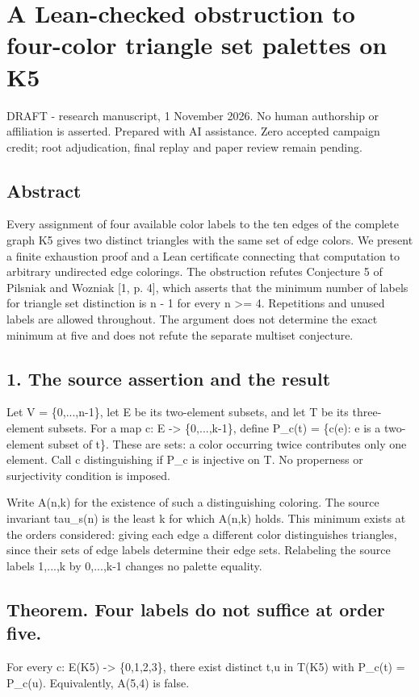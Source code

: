 \documentclass[10pt]{article}
\begin{document}
\section*{A Lean-checked obstruction to four-color triangle set palettes on K5}
DRAFT - research manuscript, 1 November 2026. No human authorship or affiliation is asserted. Prepared with AI assistance. Zero accepted campaign credit; root adjudication, final replay and paper review remain pending.


\subsection*{Abstract}
Every assignment of four available color labels to the ten edges of the complete graph K5 gives two distinct triangles with the same set of edge colors. We present a finite exhaustion proof and a Lean certificate connecting that computation to arbitrary undirected edge colorings. The obstruction refutes Conjecture 5 of Pilsniak and Wozniak [1, p. 4], which asserts that the minimum number of labels for triangle set distinction is n - 1 for every n >= 4. Repetitions and unused labels are allowed throughout. The argument does not determine the exact minimum at five and does not refute the separate multiset conjecture.


\subsection*{1. The source assertion and the result}
Let V = \{0,...,n-1\}, let E be its two-element subsets, and let T be its three-element subsets. For a map c: E -> \{0,...,k-1\}, define P\_c(t) = \{c(e): e is a two-element subset of t\}. These are sets: a color occurring twice contributes only one element. Call c distinguishing if P\_c is injective on T. No properness or surjectivity condition is imposed.


Write A(n,k) for the existence of such a distinguishing coloring. The source invariant tau\_s(n) is the least k for which A(n,k) holds. This minimum exists at the orders considered: giving each edge a different color distinguishes triangles, since their sets of edge labels determine their edge sets. Relabeling the source labels 1,...,k by 0,...,k-1 changes no palette equality.


\subsection*{Theorem. Four labels do not suffice at order five.}
For every c: E(K5) -> \{0,1,2,3\}, there exist distinct t,u in T(K5) with P\_c(t) = P\_c(u). Equivalently, A(5,4) is false.
\end{document}
